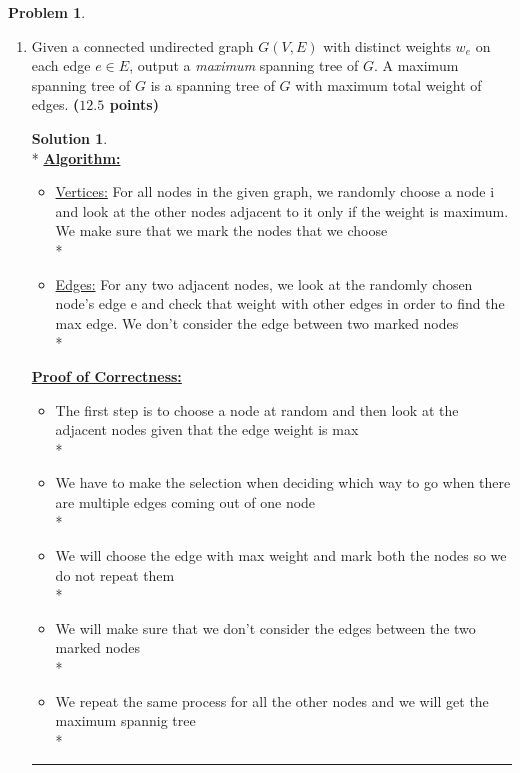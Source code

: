\documentclass{article}
\theoremstyle{definition}
\newtheorem{problem}{Problem}
\def\fline{\rule{0.75\linewidth}{0.5pt}}
\newcommand{\finishline}{\vspace{-15pt}\begin{center}\fline\end{center}}
\newtheorem*{solution*}{Solution}
\newenvironment{solution}{\begin{solution*}}{{\finishline} \end{solution*}}
\newcommand{\grade}[1]{\hfill{\textbf{($\mathbf{#1}$ points)}}}
\begin{document}
\begin{problem}
\begin{enumerate}[label=(\alph*)]
		\item Given a connected undirected graph $G(V,E)$ with distinct weights $w_e$ on each edge $e \in E$, output a \emph{maximum} spanning tree of $G$. A maximum spanning tree of $G$ is a spanning tree of $G$ with maximum total weight of edges. 
		\grade{12.5}
				\smallskip
					\begin{solution}
\hfill \bigskip\\*
				\textbf{\underline{Algorithm:}}
					\begin{itemize}
						\item{\underline{Vertices:}}  For all nodes  in the given graph, we randomly choose a node i and look at the other nodes adjacent to it only if the weight is maximum. We make sure that we mark the nodes that we choose  \\*
						\item{\underline{Edges:}} For any two adjacent nodes, we look at the randomly chosen node's edge e and check that weight with other edges in order to find the max edge. We don't consider the edge between two marked nodes \\*
					\end{itemize} 				
				\textbf{\underline{Proof of Correctness:}}
					\begin{itemize}
						\item The first step is to choose a node at random and then look at the adjacent nodes given that the edge weight is max  \\*
						\item We have to make the selection when deciding which way to go when there are multiple edges coming out of one node \\*
						\item We will choose the edge with max weight and mark both the nodes so we do not repeat them \\*
						\item We will make sure that we don't consider the edges between the two marked nodes \\*
						\item We repeat the same process for all the other nodes and we will get the maximum spannig tree \\*
					\end{itemize} 
				\end{solution}

	\end{enumerate}
	
\end{problem}
\end{document}
